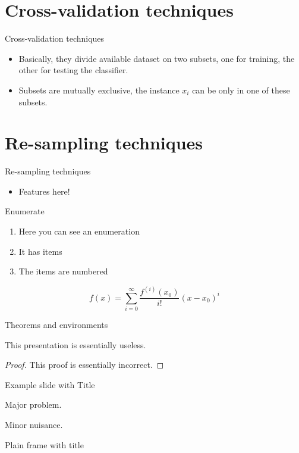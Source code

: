 \documentclass[aspectratio=169]{beamer}
\begin{document}
\section{Cross-validation techniques}
\begin{frame}{Cross-validation techniques}

\begin{itemize}
	\item Basically, they divide available dataset on two subsets, one for training, the other for testing the classifier.
	\item Subsets are mutually exclusive, the instance $x_i$ can be only in one of these subsets.
\end{itemize}
\end{frame}


\section{Re-sampling techniques}
\begin{frame}{Re-sampling techniques}

\begin{itemize}
	\item Features here!
\end{itemize}
\end{frame}



\begin{frame}{Enumerate}
\begin{enumerate}
\item Here you can see an enumeration
\item It has items
\item The items are numbered
\end{enumerate}
\[
	f(x)=\sum_{i=0}^\infty \frac{f^{(i)}(x_0)}{i!}(x-x_0)^i
\]
\end{frame}

\begin{frame}{Theorems and environments}
\begin{theorem}
This presentation is essentially useless.
\end{theorem}
\begin{proof}
This proof is essentially incorrect.
\end{proof}
\end{frame}

\begin{frame}{Example slide with Title}
\begin{example}
Major problem.
\end{example}
\begin{solution}
Minor nuisance.
\end{solution}
\end{frame}

\begin{frame}[plain]{Plain frame with title}
\lipsum[1]
\end{frame}
\end{document}
